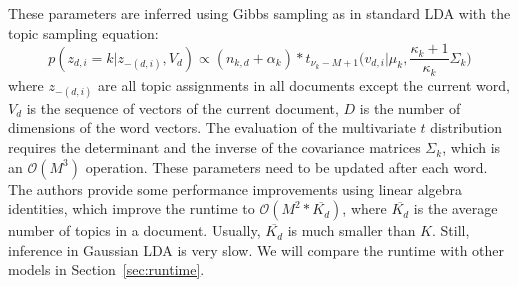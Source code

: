 \documentclass[
        a4paper,
        titlepage,
        twoside,
        parskip
        ]{scrbook}
\theoremstyle{break}
\begin{document}
These parameters are inferred using Gibbs sampling as in standard LDA with the topic sampling equation: %
\begin{equation*}
  p(z_{d,i} = k | z_{-(d,i)}, V_d) \propto (n_{k,d} + \alpha_k) * t_{\nu_k - M + 1}\Big(v_{d,i} \Big| \mu_k, \frac{\kappa_k + 1}{\kappa_k} \Sigma_k\Big)
\end{equation*}
where $z_{-(d,i)}$ are all topic assignments in all documents except the current word, $V_d$ is the sequence of vectors of the current document, $D$ is the number of dimensions of the word vectors.
The evaluation of the multivariate $t$ distribution requires the determinant and the inverse of the covariance matrices $\Sigma_k$, which is an $\mathcal{O}(M^3)$ operation.
These parameters need to be updated after each word.
The authors provide some performance improvements using linear algebra identities, which improve the runtime to $\mathcal{O}(M^2 * \overline{K_d})$, where $\overline{K_d}$ is the average number of topics in a document.
Usually, $\overline{K_d}$ is much smaller than $K$.
Still, inference in Gaussian LDA is very slow.
We will compare the runtime with other models in Section~\ref{sec:runtime}.
\end{document}
